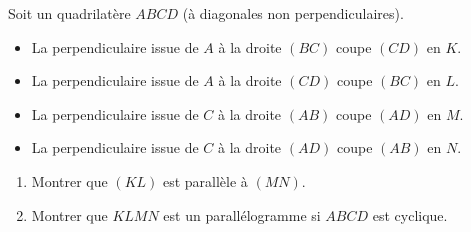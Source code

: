 \documentclass[varwidth]{standalone}
\begin{document}
    Soit un quadrilat\`ere $ABCD$ (\`a diagonales non perpendiculaires).
    \begin{itemize}
        \item La perpendiculaire issue de $A$ \`a la droite $(BC)$ coupe $(CD)$ en $K$.
        \item La perpendiculaire issue de $A$ \`a la droite $(CD)$ coupe $(BC)$ en $L$.
        \item La perpendiculaire issue de $C$ \`a la droite $(AB)$ coupe $(AD)$ en $M$.
        \item La perpendiculaire issue de $C$ \`a la droite $(AD)$ coupe $(AB)$ en $N$.
    \end{itemize}
    \begin{enumerate}[1.]
        \item Montrer que $(KL)$ est parall\`ele \`a $(MN)$.
        \item Montrer que $KLMN$ est un parall\'elogramme si $ABCD$ est cyclique.
    \end{enumerate}
\end{document}
